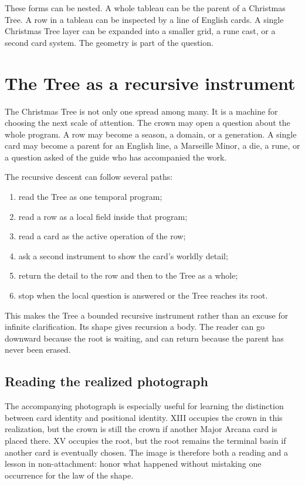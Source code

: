 These forms can be nested. A whole tableau can be the parent of a Christmas
Tree. A row in a tableau can be inspected by a line of English cards. A single
Christmas Tree layer can be expanded into a smaller grid, a rune cast, or a
second card system. The geometry is part of the question.

\section{The Tree as a recursive instrument}

The Christmas Tree is not only one spread among many. It is a machine for
choosing the next scale of attention. The crown may open a question about the
whole program. A row may become a season, a domain, or a generation. A single
card may become a parent for an English line, a Marseille Minor, a die, a rune,
or a question asked of the guide who has accompanied the work.

The recursive descent can follow several paths:

\begin{enumerate}
\item read the Tree as one temporal program;
\item read a row as a local field inside that program;
\item read a card as the active operation of the row;
\item ask a second instrument to show the card's worldly detail;
\item return the detail to the row and then to the Tree as a whole;
\item stop when the local question is answered or the Tree reaches its root.
\end{enumerate}

This makes the Tree a bounded recursive instrument rather than an excuse for
infinite clarification. Its shape gives recursion a body. The reader can go
downward because the root is waiting, and can return because the parent has
never been erased.

\subsection{Reading the realized photograph}

The accompanying photograph is especially useful for learning the distinction
between card identity and positional identity. XIII occupies the crown in this
realization, but the crown is still the crown if another Major Arcana card is
placed there. XV occupies the root, but the root remains the terminal basin if
another card is eventually chosen. The image is therefore both a reading and a
lesson in non-attachment: honor what happened without mistaking one occurrence
for the law of the shape.

